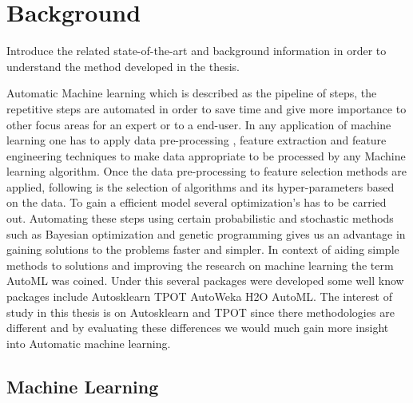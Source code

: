 \chapter{Background}\label{chap:background}


Introduce the related state-of-the-art and background information in order to understand the method developed in the thesis. 

Automatic Machine learning which is described as the pipeline of steps, the repetitive steps are automated in order to save time and give more importance to other focus areas for an expert or to a end-user. In any application of machine learning one has to apply data pre-processing , feature extraction and feature engineering techniques to make data appropriate to be processed by any Machine learning algorithm. Once the data pre-processing to feature selection methods are applied, following is the selection of algorithms and its hyper-parameters based on the data. To gain a efficient model several optimization's has to be carried out. Automating these steps using certain probabilistic and stochastic methods such as Bayesian optimization and genetic programming gives us an advantage in gaining solutions to the problems faster and simpler. In context of aiding simple methods to solutions and improving the research on machine learning the term AutoML\cite{autoML} was coined. Under this several packages were developed some well know packages include Autosklearn\cite{autosklearn} TPOT\cite{tpot} AutoWeka\cite{autoweka-Thornton:2013:ACS:2487575.2487629} H2O AutoML. The interest of study in this thesis is on Autosklearn and TPOT since there methodologies are different and by evaluating these differences we would much gain more insight into Automatic machine learning.

\section{Machine Learning}

